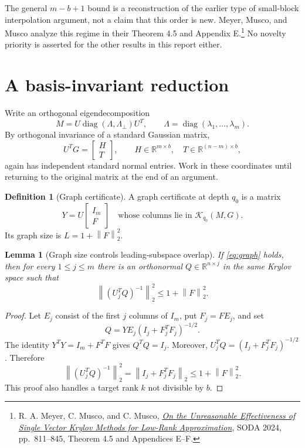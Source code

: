 \documentclass[11pt]{article}
\newtheorem{lemma}[theorem]{Lemma}
\theoremstyle{definition}
\newtheorem{definition}[theorem]{Definition}
\newcommand{\R}{\mathbb R}
\newcommand{\diag}{\operatorname{diag}}
\newcommand{\K}{\mathcal K}
\newcommand{\norm}[1]{\left\lVert #1\right\rVert}
\begin{document}
The general $m-b+1$ bound is a reconstruction of the earlier type of
small-block interpolation argument, not a claim that this order is new.
Meyer, Musco, and Musco analyze this regime in their Theorem 4.5 and
Appendix E.\footnote{R. A. Meyer, C. Musco, and C. Musco,
\href{https://arxiv.org/abs/2305.02535}{\emph{On the Unreasonable Effectiveness of Single Vector Krylov Methods for Low-Rank Approximation}},
SODA 2024, pp.~811--845, Theorem 4.5 and Appendices E--F.}
No novelty priority is asserted for the other results in this report either.

\section{A basis-invariant reduction}
\label{sec:reduction}

Write an orthogonal eigendecomposition
\[
 M=U\diag(\Lambda,\Lambda_\perp)U^T,
 \qquad \Lambda=\diag(\lambda_1,\ldots,\lambda_m).
\]
By orthogonal invariance of a standard Gaussian matrix,
\[
 U^TG=\begin{bmatrix}H\\T\end{bmatrix},
 \qquad H\in\R^{m\times b},\quad T\in\R^{(n-m)\times b},
\]
again has independent standard normal entries. Work in these coordinates
until returning to the original matrix at the end of an argument.

\begin{definition}[Graph certificate]
A graph certificate at depth $q_0$ is a matrix
\begin{equation}
 Y=U\begin{bmatrix}I_m\\F\end{bmatrix}
 \quad\text{whose columns lie in }\K_{q_0}(M,G).
 \label{eq:graph}
\end{equation}
Its graph size is $L=1+\norm{F}_2^2$.
\end{definition}

\begin{lemma}[Graph size controls leading-subspace overlap]
\label{lem:graph-good}
If \eqref{eq:graph} holds, then for every $1\leq j\leq m$ there is an
orthonormal $Q\in\R^{n\times j}$ in the same Krylov space such that
\[
 \norm{(U_j^TQ)^{-1}}_2^2\leq 1+\norm{F}_2^2.
\]
\end{lemma}
\begin{proof}
Let $E_j$ consist of the first $j$ columns of $I_m$, put $F_j=FE_j$, and set
\[
 Q=YE_j(I_j+F_j^TF_j)^{-1/2}.
\]
The identity $Y^TY=I_m+F^TF$ gives $Q^TQ=I_j$. Moreover,
$U_j^TQ=(I_j+F_j^TF_j)^{-1/2}$. Therefore
\[
 \norm{(U_j^TQ)^{-1}}_2^2
 =\norm{I_j+F_j^TF_j}_2
 \leq1+\norm{F}_2^2.
\]
This proof also handles a target rank $k$ not divisible by $b$.
\end{proof}
\end{document}
